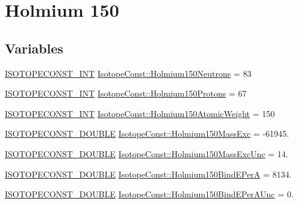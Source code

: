 \hypertarget{group___isotope_const-_holmium-_ho150}{}\section{Holmium 150}
\label{group___isotope_const-_holmium-_ho150}
\subsection*{Variables}
\begin{DoxyCompactItemize}
\item 
\mbox{\hyperlink{group___isotope_const-_macros_ga5f18360b3e99483a35c32d789e62621c}{I\+S\+O\+T\+O\+P\+E\+C\+O\+N\+S\+T\+\_\+\+I\+NT}} \mbox{\hyperlink{group___isotope_const-_holmium-_ho150_ga4b2d6423048aa505d630b1f1781c7dcd}{Isotope\+Const\+::\+Holmium150\+Neutrons}} = 83
\item 
\mbox{\hyperlink{group___isotope_const-_macros_ga5f18360b3e99483a35c32d789e62621c}{I\+S\+O\+T\+O\+P\+E\+C\+O\+N\+S\+T\+\_\+\+I\+NT}} \mbox{\hyperlink{group___isotope_const-_holmium-_ho150_ga1f04fd5ec01c631ecce7725c67dc5ed1}{Isotope\+Const\+::\+Holmium150\+Protons}} = 67
\item 
\mbox{\hyperlink{group___isotope_const-_macros_ga5f18360b3e99483a35c32d789e62621c}{I\+S\+O\+T\+O\+P\+E\+C\+O\+N\+S\+T\+\_\+\+I\+NT}} \mbox{\hyperlink{group___isotope_const-_holmium-_ho150_ga3181ee48b2689998b1edfa5434ff9c16}{Isotope\+Const\+::\+Holmium150\+Atomic\+Weight}} = 150
\item 
\mbox{\hyperlink{group___isotope_const-_macros_ga8f45a7272ce02c0b4c65c44636ed719a}{I\+S\+O\+T\+O\+P\+E\+C\+O\+N\+S\+T\+\_\+\+D\+O\+U\+B\+LE}} \mbox{\hyperlink{group___isotope_const-_holmium-_ho150_ga2f7fb5ce361d00ca25ff3b167832b147}{Isotope\+Const\+::\+Holmium150\+Mass\+Exc}} = -\/61945.
\item 
\mbox{\hyperlink{group___isotope_const-_macros_ga8f45a7272ce02c0b4c65c44636ed719a}{I\+S\+O\+T\+O\+P\+E\+C\+O\+N\+S\+T\+\_\+\+D\+O\+U\+B\+LE}} \mbox{\hyperlink{group___isotope_const-_holmium-_ho150_ga4183c690a5cbc68a898e16e70f522afe}{Isotope\+Const\+::\+Holmium150\+Mass\+Exc\+Unc}} = 14.
\item 
\mbox{\hyperlink{group___isotope_const-_macros_ga8f45a7272ce02c0b4c65c44636ed719a}{I\+S\+O\+T\+O\+P\+E\+C\+O\+N\+S\+T\+\_\+\+D\+O\+U\+B\+LE}} \mbox{\hyperlink{group___isotope_const-_holmium-_ho150_gaaaa587e690df4c81ab3866d3d286f98b}{Isotope\+Const\+::\+Holmium150\+Bind\+E\+PerA}} = 8134.
\item 
\mbox{\hyperlink{group___isotope_const-_macros_ga8f45a7272ce02c0b4c65c44636ed719a}{I\+S\+O\+T\+O\+P\+E\+C\+O\+N\+S\+T\+\_\+\+D\+O\+U\+B\+LE}} \mbox{\hyperlink{group___isotope_const-_holmium-_ho150_ga87f44e2eb2678991f24521642c923096}{Isotope\+Const\+::\+Holmium150\+Bind\+E\+Per\+A\+Unc}} = 0.

\end{DoxyCompactItemize}
